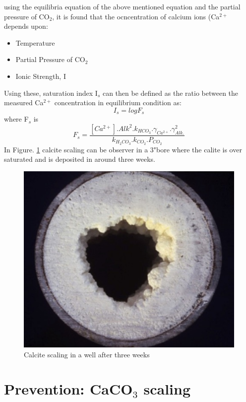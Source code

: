 using the equilibria equation of the above mentioned equation and the partial pressure of CO$_2$, it is found that the ocncentration of calcium ions (Ca$^{2+}$ depends upon: 
\begin{itemize}
    \item Temperature
    \item Partial Pressure of CO$_2$
    \item Ionic Strength, I

\end{itemize}
Using these, saturation index I$_s$ can then be defined as the ratio between the measured Ca$^{2+}$ concentration in equilibrium condition as: 
\begin{equation}
    I_s = log F_s
\end{equation}
where F$_s$ is
\begin{equation}
    F_s = \frac{[Ca^{2+}].Alk^2.k_{HCO_3}.\gamma_{Ca^{2+}}.\gamma^2_{Alk.}}{k_{H_2CO_3}.k_{CO_2}.P_{CO_2}}
\end{equation}
\newline
In Figure. \ref{fig:calcl} calcite scaling can be observer in a 3"bore where the calite is over saturated and is deposited in around three weeks. \cite{brown2013mineral}
\begin{figure}
    \centering
    \includegraphics[scale=0.4]{calcim.jpeg}
    \caption{Calcite scaling in a well after three weeks \cite{brown2013mineral}}
    \label{fig:calcl}
\end{figure}
\section{Prevention: CaCO$_3$ scaling}
\newline \newline

